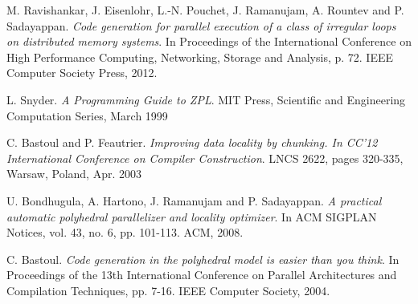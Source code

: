 \documentclass{sigplanconf}
\begin{document}
\begin{thebibliography}
M. Ravishankar, J. Eisenlohr, L.-N. Pouchet, J. Ramanujam, A. Rountev and P. Sadayappan. \emph{Code generation for parallel execution of a class of irregular loops on distributed memory systems}. In Proceedings of the International Conference on High Performance Computing, Networking, Storage and Analysis, p. 72. IEEE Computer Society Press, 2012.


L. Snyder. \emph{A Programming Guide to ZPL}. MIT Press, Scientific and Engineering Computation Series, March 1999

C. Bastoul and P. Feautrier. \emph{Improving data locality by chunking. In CC'12 International Conference on Compiler Construction}. LNCS 2622, pages 320-335, Warsaw, Poland, Apr. 2003

U. Bondhugula, A. Hartono, J. Ramanujam and P. Sadayappan. \emph{A practical automatic polyhedral parallelizer and locality optimizer}. In ACM SIGPLAN Notices, vol. 43, no. 6, pp. 101-113. ACM, 2008.


C. Bastoul. \emph{Code generation in the polyhedral model is easier than you think}. In Proceedings of the 13th International Conference on Parallel Architectures and Compilation Techniques, pp. 7-16. IEEE Computer Society, 2004.


\end{thebibliography}
\end{document}
